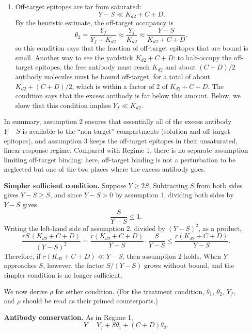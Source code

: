 \begin{enumerate}
    Formally, below we show that $S(1-\theta_1)\le rS(K_{d2}+C+D)/(Y-S)$,
    so this condition makes the free target negligible relative to $Y-S$.

    \item Off-target epitopes are far from saturated:
    $$
    Y-S\ll K_{d2}+C+D.
    $$
    By the heuristic estimate, the off-target occupancy is
    $$
    \theta_2=\frac{Y_f}{Y_f+K_{d2}}\approx\frac{Y_f}{K_{d2}}
    \approx\frac{Y-S}{K_{d2}+C+D},
    $$
    so this condition says that the fraction of off-target epitopes that
    are bound is small. Another way to see the yardstick
    $K_{d2}+C+D$: to half-occupy the off-target epitopes, the free antibody
    must reach $K_{d2}$ and about $(C+D)/2$ antibody molecules must be bound
    off-target, for a total of about $K_{d2}+(C+D)/2$, which is within a
    factor of 2 of $K_{d2}+C+D$. The condition says that the excess
    antibody is far below this amount. Below, we show that this condition
    implies $Y_f\ll K_{d2}$.
\end{enumerate}
In summary, assumption 2 ensures that essentially all of the excess
antibody $Y-S$ is available to the ``non-target'' compartments (solution
and off-target epitopes), and assumption 3 keeps the off-target epitopes
in their unsaturated, linear-response regime. Compared with Regime 1,
there is no separate assumption limiting off-target binding: here,
off-target binding is not a perturbation to be neglected but one of the
two places where the excess antibody goes.

\textbf{Simpler sufficient condition.} Suppose $Y\ge2S$. Subtracting $S$
from both sides gives $Y-S\ge S$, and since $Y-S>0$ by assumption 1,
dividing both sides by $Y-S$ gives
$$
\frac{S}{Y-S}\le1.
$$
Writing the left-hand side of assumption 2, divided by $(Y-S)^2$, as a
product,
$$
\frac{rS\,(K_{d2}+C+D)}{(Y-S)^2}
=\frac{r(K_{d2}+C+D)}{Y-S}\cdot\frac{S}{Y-S}
\le\frac{r(K_{d2}+C+D)}{Y-S}.
$$
Therefore, if $r(K_{d2}+C+D)\ll Y-S$, then assumption 2 holds. When $Y$
approaches $S$, however, the factor $S/(Y-S)$ grows without bound, and
the simpler condition is no longer sufficient.

We now derive $\rho$ for either condition. (For the treatment condition,
$\theta_1$, $\theta_2$, $Y_f$, and $\rho$ should be read as their primed
counterparts.)

\textbf{Antibody conservation.} As in Regime 1,
$$
Y=Y_f+S\theta_1+(C+D)\theta_2.
$$

